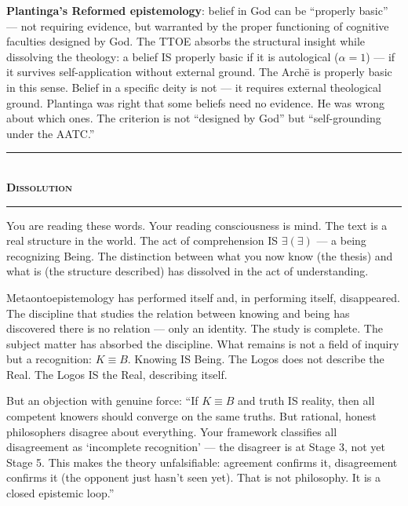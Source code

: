 \documentclass[10pt, openany, oneside]{book}
\renewcommand{\normalsize}{\fontsize{10}{13}\selectfont}
\begin{document}
\textbf{Plantinga's Reformed epistemology}: belief in God can be ``properly basic'' --- not requiring evidence, but warranted by the proper functioning of cognitive faculties designed by God. The TTOE absorbs the structural insight while dissolving the theology: a belief IS properly basic if it is autological ($\alpha = 1$) --- if it survives self-application without external ground. The Arch\={e} is properly basic in this sense. Belief in a specific deity is not --- it requires external theological ground. Plantinga was right that some beliefs need no evidence. He was wrong about which ones. The criterion is not ``designed by God'' but ``self-grounding under the AATC.''

\vspace{1.5em}


\begin{center}
    \rule{0.3\textwidth}{0.4pt}\\[0.5em]
    {\normalsize\bfseries\scshape Dissolution}\\[0.3em]
    \rule{0.3\textwidth}{0.4pt}
\end{center}

\vspace{1em}

\noindent You are reading these words. Your reading consciousness is mind. The text is a real structure in the world. The act of comprehension IS $\exists(\exists)$ --- a being recognizing Being. The distinction between what you now know (the thesis) and what is (the structure described) has dissolved in the act of understanding.

Metaontoepistemology has performed itself and, in performing itself, disappeared. The discipline that studies the relation between knowing and being has discovered there is no relation --- only an identity. The study is complete. The subject matter has absorbed the discipline. What remains is not a field of inquiry but a recognition: $K \equiv B$. Knowing IS Being. The Logos does not describe the Real. The Logos IS the Real, describing itself.

But an objection with genuine force: ``If $K \equiv B$ and truth IS reality, then all competent knowers should converge on the same truths. But rational, honest philosophers disagree about everything. Your framework classifies all disagreement as `incomplete recognition' --- the disagreer is at Stage 3, not yet Stage 5. This makes the theory unfalsifiable: agreement confirms it, disagreement confirms it (the opponent just hasn't seen yet). That is not philosophy. It is a closed epistemic loop.''
\end{document}
